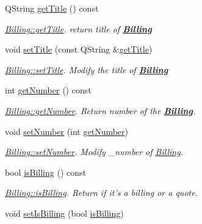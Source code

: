 \begin{DoxyCompactItemize}
\item 
Q\-String \hyperlink{classBilling_ad817d4a1dfa011d20b4358a896662f0e}{get\-Title} () const 
\begin{DoxyCompactList}\small\item\em \hyperlink{classBilling_ad817d4a1dfa011d20b4358a896662f0e}{Billing\-::get\-Title}. return title of {\bfseries \hyperlink{classBilling}{Billing}} \end{DoxyCompactList}\item 
void \hyperlink{classBilling_a3e5e98325bd0e9fb4c253ddf07bf66c8}{set\-Title} (const Q\-String \&\hyperlink{classBilling_ad817d4a1dfa011d20b4358a896662f0e}{get\-Title})
\begin{DoxyCompactList}\small\item\em \hyperlink{classBilling_a3e5e98325bd0e9fb4c253ddf07bf66c8}{Billing\-::set\-Title}. Modify the title of {\bfseries \hyperlink{classBilling}{Billing}} \end{DoxyCompactList}\item 
int \hyperlink{classBilling_a23a9446aef6af58bcfa698b76cc24731}{get\-Number} () const 
\begin{DoxyCompactList}\small\item\em \hyperlink{classBilling_a23a9446aef6af58bcfa698b76cc24731}{Billing\-::get\-Number}. Return number of the {\bfseries \hyperlink{classBilling}{Billing}}. \end{DoxyCompactList}\item 
void \hyperlink{classBilling_a1178eab66407b0761c35a13d8da84cdb}{set\-Number} (int \hyperlink{classBilling_a23a9446aef6af58bcfa698b76cc24731}{get\-Number})
\begin{DoxyCompactList}\small\item\em \hyperlink{classBilling_a1178eab66407b0761c35a13d8da84cdb}{Billing\-::set\-Number}. Modify {\itshape \-\_\-number} of \hyperlink{classBilling}{Billing}. \end{DoxyCompactList}\item 
bool \hyperlink{classBilling_ad616bbb5664e0ba2bac6982f06a7c723}{is\-Billing} () const 
\begin{DoxyCompactList}\small\item\em \hyperlink{classBilling_ad616bbb5664e0ba2bac6982f06a7c723}{Billing\-::is\-Billing}. Return if it's a billing or a quote. \end{DoxyCompactList}\item 
void \hyperlink{classBilling_a81a3b85e0e051239521b4e3d93f297c2}{set\-Is\-Billing} (bool \hyperlink{classBilling_ad616bbb5664e0ba2bac6982f06a7c723}{is\-Billing})

\end{DoxyCompactItemize}
